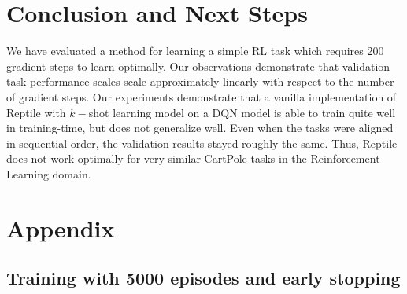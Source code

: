 \documentclass[runningheads]{llncs}
\begin{document}
\section{Conclusion and Next Steps}
We have evaluated a method for learning a simple RL task which requires 200 gradient steps to learn optimally. Our observations demonstrate that validation task performance scales scale approximately linearly with respect to the number of gradient steps. Our experiments demonstrate that a vanilla implementation of Reptile with $k-$shot learning model on a DQN model is able to train quite well in training-time, but does not generalize well. Even when the tasks were aligned in sequential order, the validation results stayed roughly the same.   Thus, Reptile does not work optimally for very similar CartPole tasks in the Reinforcement Learning domain.



\section{Appendix}

\subsection{Training with 5000 episodes and early stopping}
\end{document}
